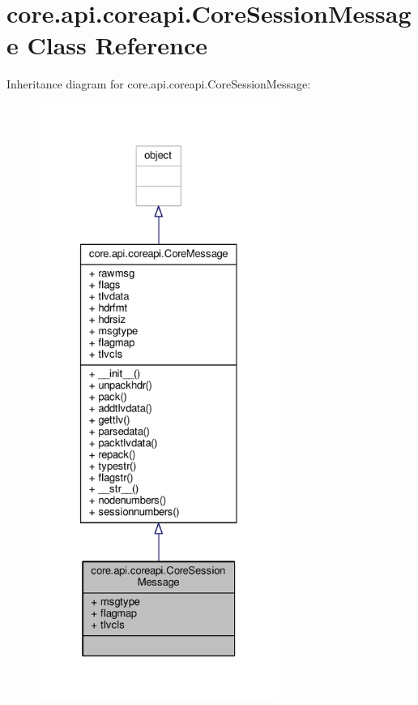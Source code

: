 \hypertarget{classcore_1_1api_1_1coreapi_1_1_core_session_message}{\section{core.\+api.\+coreapi.\+Core\+Session\+Message Class Reference}
\label{classcore_1_1api_1_1coreapi_1_1_core_session_message}
}


Inheritance diagram for core.\+api.\+coreapi.\+Core\+Session\+Message\+:
\nopagebreak
\begin{figure}[H]
\begin{center}
\leavevmode
\includegraphics[height=550pt]{classcore_1_1api_1_1coreapi_1_1_core_session_message__inherit__graph}
\end{center}
\end{figure}


